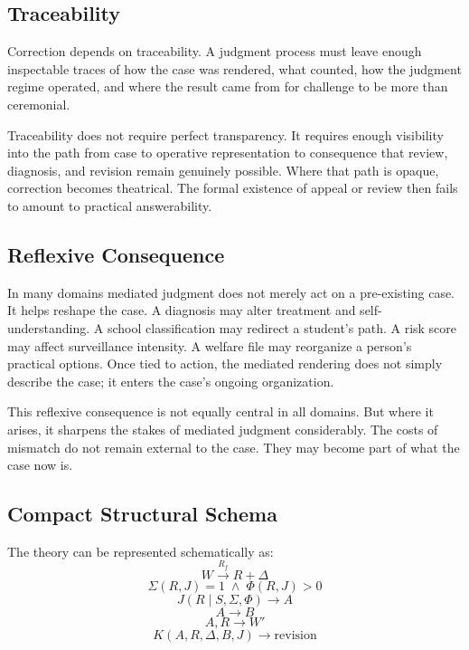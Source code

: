 \documentclass[11pt]{article}
\begin{document}
\subsection{Traceability}

Correction depends on traceability. A judgment process must leave enough inspectable traces of how the case was rendered, what counted, how the judgment regime operated, and where the result came from for challenge to be more than ceremonial.

Traceability does not require perfect transparency. It requires enough visibility into the path from case to operative representation to consequence that review, diagnosis, and revision remain genuinely possible. Where that path is opaque, correction becomes theatrical. The formal existence of appeal or review then fails to amount to practical answerability.

\subsection{Reflexive Consequence}

In many domains mediated judgment does not merely act on a pre-existing case. It helps reshape the case. A diagnosis may alter treatment and self-understanding. A school classification may redirect a student's path. A risk score may affect surveillance intensity. A welfare file may reorganize a person's practical options. Once tied to action, the mediated rendering does not simply describe the case; it enters the case's ongoing organization.

This reflexive consequence is not equally central in all domains. But where it arises, it sharpens the stakes of mediated judgment considerably. The costs of mismatch do not remain external to the case. They may become part of what the case now is.

\subsection{Compact Structural Schema}

The theory can be represented schematically as:
\[
W \xrightarrow{R_f} R + \Delta
\]
\[
\Sigma(R,J)=1 \;\wedge\; \Phi(R,J)>0
\]
\[
J(R \mid S,\Sigma,\Phi) \rightarrow A
\]
\[
A \rightarrow B
\]
\[
A,R \rightarrow W'
\]
\[
K(A,R,\Delta,B,J) \rightarrow \text{revision}
\]
\end{document}
